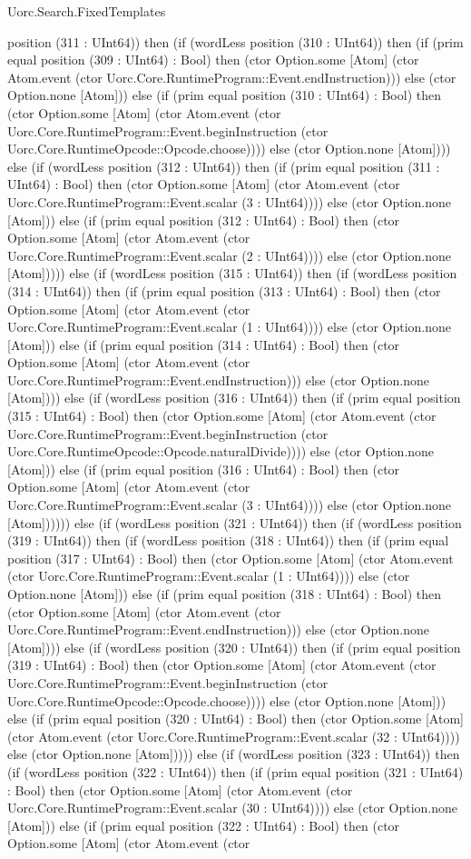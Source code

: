 \begin{lexlean}{Uorc.Search.FixedTemplates}
\begin{semanticmodule}
{position (311 : UInt64)) then (if (wordLess position (310 : UInt64)) then (if (prim equal position (309 : UInt64) : Bool) then (ctor Option.some [Atom] (ctor Atom.event (ctor Uorc.Core.RuntimeProgram::Event.endInstruction))) else (ctor Option.none [Atom])) else (if (prim equal position (310 : UInt64) : Bool) then (ctor Option.some [Atom] (ctor Atom.event (ctor Uorc.Core.RuntimeProgram::Event.beginInstruction (ctor Uorc.Core.RuntimeOpcode::Opcode.choose)))) else (ctor Option.none [Atom]))) else (if (wordLess position (312 : UInt64)) then (if (prim equal position (311 : UInt64) : Bool) then (ctor Option.some [Atom] (ctor Atom.event (ctor Uorc.Core.RuntimeProgram::Event.scalar (3 : UInt64)))) else (ctor Option.none [Atom])) else (if (prim equal position (312 : UInt64) : Bool) then (ctor Option.some [Atom] (ctor Atom.event (ctor Uorc.Core.RuntimeProgram::Event.scalar (2 : UInt64)))) else (ctor Option.none [Atom])))) else (if (wordLess position (315 : UInt64)) then (if (wordLess position (314 : UInt64)) then (if (prim equal position (313 : UInt64) : Bool) then (ctor Option.some [Atom] (ctor Atom.event (ctor Uorc.Core.RuntimeProgram::Event.scalar (1 : UInt64)))) else (ctor Option.none [Atom])) else (if (prim equal position (314 : UInt64) : Bool) then (ctor Option.some [Atom] (ctor Atom.event (ctor Uorc.Core.RuntimeProgram::Event.endInstruction))) else (ctor Option.none [Atom]))) else (if (wordLess position (316 : UInt64)) then (if (prim equal position (315 : UInt64) : Bool) then (ctor Option.some [Atom] (ctor Atom.event (ctor Uorc.Core.RuntimeProgram::Event.beginInstruction (ctor Uorc.Core.RuntimeOpcode::Opcode.naturalDivide)))) else (ctor Option.none [Atom])) else (if (prim equal position (316 : UInt64) : Bool) then (ctor Option.some [Atom] (ctor Atom.event (ctor Uorc.Core.RuntimeProgram::Event.scalar (3 : UInt64)))) else (ctor Option.none [Atom]))))) else (if (wordLess position (321 : UInt64)) then (if (wordLess position (319 : UInt64)) then (if (wordLess position (318 : UInt64)) then (if (prim equal position (317 : UInt64) : Bool) then (ctor Option.some [Atom] (ctor Atom.event (ctor Uorc.Core.RuntimeProgram::Event.scalar (1 : UInt64)))) else (ctor Option.none [Atom])) else (if (prim equal position (318 : UInt64) : Bool) then (ctor Option.some [Atom] (ctor Atom.event (ctor Uorc.Core.RuntimeProgram::Event.endInstruction))) else (ctor Option.none [Atom]))) else (if (wordLess position (320 : UInt64)) then (if (prim equal position (319 : UInt64) : Bool) then (ctor Option.some [Atom] (ctor Atom.event (ctor Uorc.Core.RuntimeProgram::Event.beginInstruction (ctor Uorc.Core.RuntimeOpcode::Opcode.choose)))) else (ctor Option.none [Atom])) else (if (prim equal position (320 : UInt64) : Bool) then (ctor Option.some [Atom] (ctor Atom.event (ctor Uorc.Core.RuntimeProgram::Event.scalar (32 : UInt64)))) else (ctor Option.none [Atom])))) else (if (wordLess position (323 : UInt64)) then (if (wordLess position (322 : UInt64)) then (if (prim equal position (321 : UInt64) : Bool) then (ctor Option.some [Atom] (ctor Atom.event (ctor Uorc.Core.RuntimeProgram::Event.scalar (30 : UInt64)))) else (ctor Option.none [Atom])) else (if (prim equal position (322 : UInt64) : Bool) then (ctor Option.some [Atom] (ctor Atom.event (ctor }
\end{semanticmodule}
\end{lexlean}
